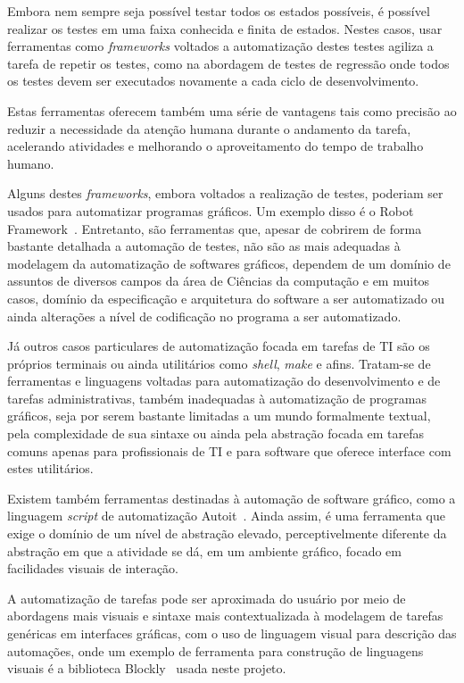 \documentclass[tg]{mdtufsm}
\begin{document}
        Embora nem sempre seja possível testar todos os estados possíveis, é possível realizar os testes em uma faixa conhecida e finita de estados. Nestes casos, usar ferramentas como \emph{frameworks} voltados a automatização destes testes agiliza a tarefa de repetir os testes, como na abordagem de testes de regressão onde todos os testes devem ser executados novamente a cada ciclo de desenvolvimento.

        Estas ferramentas oferecem também uma série de vantagens tais como precisão ao reduzir a necessidade da atenção humana durante o andamento da tarefa, acelerando atividades e melhorando o aproveitamento do tempo de trabalho humano.

        Alguns destes \emph{frameworks}, embora voltados a realização de testes, poderiam ser usados para automatizar programas gráficos. Um exemplo disso é o Robot Framework~\cite{robotFW}. Entretanto, são ferramentas que, apesar de cobrirem de forma bastante detalhada a automação de testes, não são as mais adequadas à modelagem da automatização de softwares gráficos, dependem de um domínio de assuntos de diversos campos da área de Ciências da computação e em muitos casos, domínio da especificação e arquitetura do software a ser automatizado ou ainda alterações a nível de codificação no programa a ser automatizado.

        Já outros casos particulares de automatização focada em tarefas de TI são os próprios terminais ou ainda utilitários como \emph{shell},  \emph{make} e afins. Tratam-se de ferramentas e linguagens voltadas para automatização do desenvolvimento e de tarefas administrativas, também inadequadas à automatização de programas gráficos, seja por serem bastante limitadas a um mundo formalmente textual, pela complexidade de sua sintaxe ou ainda pela abstração focada em tarefas comuns apenas para profissionais de TI e para software que oferece interface com estes utilitários.

        Existem também ferramentas destinadas à automação de software gráfico, como a linguagem \emph{script} de automatização Autoit~\cite{autoit}. Ainda assim, é uma ferramenta que exige o domínio de um nível de abstração elevado, perceptivelmente diferente da abstração em que a atividade se dá, em um ambiente gráfico, focado em facilidades visuais de interação.

        A automatização de tarefas pode ser aproximada do usuário por meio de abordagens mais visuais e sintaxe mais contextualizada à modelagem de tarefas genéricas em interfaces gráficas, com o uso de linguagem visual para descrição das automações, onde um exemplo de ferramenta para construção de linguagens visuais é a biblioteca Blockly~\cite{BlocklyResource} usada neste projeto.
\end{document}
